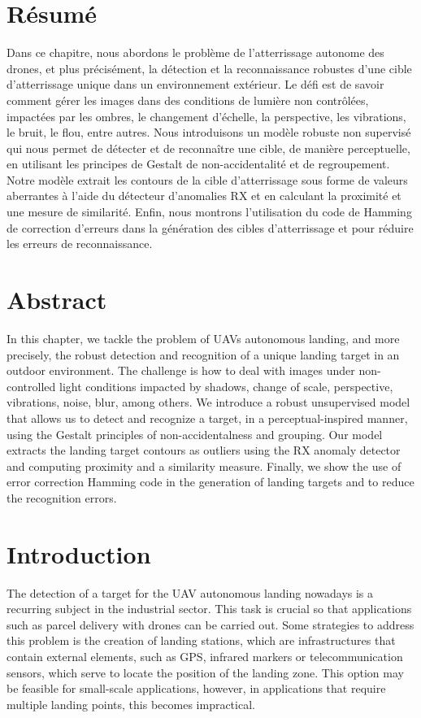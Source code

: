 \section*{Résumé}
\noindent Dans ce chapitre, nous abordons le problème de l'atterrissage autonome des drones, et plus précisément, la détection et la reconnaissance robustes d'une cible d'atterrissage unique dans un environnement extérieur. Le défi est de savoir comment gérer les images dans des conditions de lumière non contrôlées, impactées par les ombres, le changement d'échelle, la perspective, les vibrations, le bruit, le flou, entre autres. Nous introduisons un modèle robuste non supervisé qui nous permet de détecter et de reconnaître une cible, de manière perceptuelle, en utilisant les principes de Gestalt de non-accidentalité et de regroupement. Notre modèle extrait les contours de la cible d'atterrissage sous forme de valeurs aberrantes à l'aide du détecteur d'anomalies RX et en calculant la proximité et une mesure de similarité. Enfin, nous montrons l'utilisation du code de Hamming de correction d'erreurs dans la génération des cibles d'atterrissage et pour réduire les erreurs de reconnaissance.

\section*{Abstract}
\noindent In this chapter, we tackle the problem of UAVs autonomous landing, and more precisely, the robust detection and recognition of a unique landing target in an outdoor environment. The challenge is how to deal with images under non-controlled light conditions impacted by shadows, change of scale, perspective, vibrations, noise, blur, among others. We introduce a robust unsupervised model that allows us to detect and recognize a target, in a perceptual-inspired manner, using the Gestalt principles of non-accidentalness and grouping.  Our model extracts the landing target contours as outliers using the RX anomaly detector and computing proximity and a similarity measure.  Finally, we show the use of error correction Hamming code in the generation of landing targets and to reduce the recognition errors. 


\section{Introduction}\label{sec:introduction_ch1}

The detection of a target for the UAV autonomous landing nowadays is a recurring subject in the industrial sector. This task is crucial so that applications such as parcel delivery with drones can be carried out. Some strategies to address this problem is the creation of landing stations, which are infrastructures that contain external elements, such as GPS, infrared markers or telecommunication sensors, which serve to locate the position of the landing zone. This option may be feasible for small-scale applications, however, in applications that require multiple landing points, this becomes impractical.

